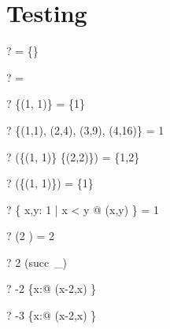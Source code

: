 \documentclass{article}
\newcommand{\negate}{-}
\begin{document}
\section{Testing \dom}
\begin{zed} \vdash? \dom \emptyset[\nat \cross \num] = \{\} \end{zed}
\begin{zed} \vdash? \dom \emptyset[\nat \cross \power\nat] = \emptyset \end{zed}
\begin{zed} \vdash? \dom \{(1, 1)\} = \{1\} \end{zed}
\begin{zed} \vdash? \dom \{(1,1), (2,4), (3,9), (4,16)\} = 1  \end{zed}
\begin{zed} \vdash? \dom (\{(1, 1)\} \cup \{(2,2)\}) = \{1,2\} \end{zed}
\begin{zed} \vdash? \dom (\emptyset \cup \{(1, 1)\}) = \{1\} \end{zed}
\begin{zed} \vdash? \dom \{ x,y: 1  | x < y @ (x,y) \} = 1  \end{zed}
\begin{zed} \vdash? \dom (2   ) = 2  \end{zed}
\begin{zed} \vdash? 2 \in \dom (succ~\_) \end{zed}
\begin{zed} \vdash? \negate 2 \in \dom \{x:\nat @ (x-2,x) \} \end{zed}
\begin{zed} \vdash? \negate 3 \notin \dom \{x:\nat @ (x-2,x) \} \end{zed}
\end{document}
